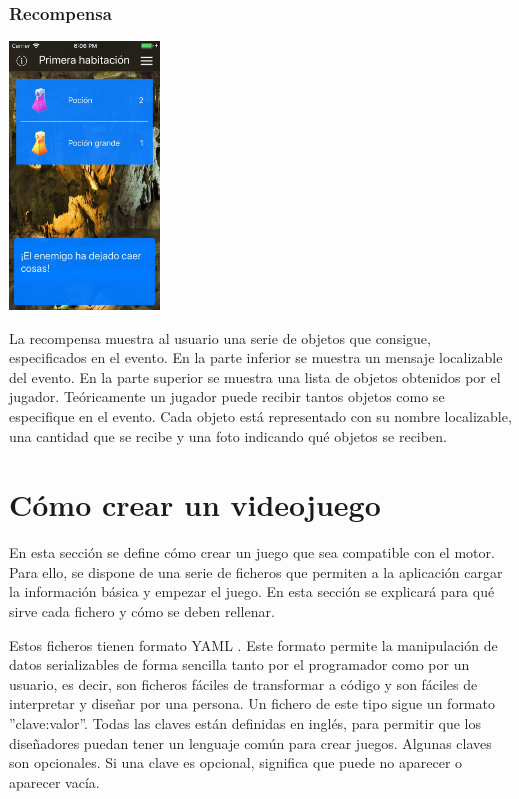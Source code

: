 \subsubsection{Recompensa}
\begin{center}
	\includegraphics[width=0.3\textwidth]{include/snapshots/reward.jpg}
\end{center}
La recompensa muestra al usuario una serie de objetos que consigue, especificados en el evento.
En la parte inferior se muestra un mensaje localizable del evento. En la parte superior se muestra una lista de objetos obtenidos por el jugador. Teóricamente un jugador puede recibir tantos objetos como se especifique en el evento.
Cada objeto está representado con su nombre localizable, una cantidad que se recibe y una foto indicando qué objetos se reciben.

\section{Cómo crear un videojuego} \label{developmentGuide}
En esta sección se define cómo crear un juego que sea compatible con el motor. Para ello, se dispone de una serie de ficheros que permiten a la aplicación cargar la información básica y empezar el juego. En esta sección se explicará para qué sirve cada fichero y cómo se deben rellenar.

Estos ficheros tienen formato YAML \cite{yamlDocumentation}. Este formato permite la manipulación de datos serializables de forma sencilla tanto por el programador como por un usuario, es decir, son ficheros fáciles de transformar a código y son fáciles de interpretar y diseñar por una persona. 
Un fichero de este tipo sigue un formato ''clave:valor''. Todas las claves están definidas en inglés, para permitir que los diseñadores puedan tener un lenguaje común para crear juegos.
Algunas claves son opcionales. Si una clave es opcional, significa que puede no aparecer o aparecer vacía.


